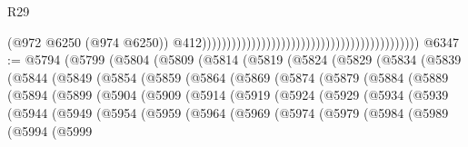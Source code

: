 \begin{lexlean}{R29}
\begin{coremodule}
                                                                                            (@972
                                                                                              @6250
                                                                                              (@974
                                                                                                @6250))
                                                                                            @412))))))))))))))))))))))))))))))))))))))))))))
@6347 := @5794
    (@5799
      (@5804
        (@5809
          (@5814
            (@5819
              (@5824
                (@5829
                  (@5834
                    (@5839
                      (@5844
                        (@5849
                          (@5854
                            (@5859
                              (@5864
                                (@5869
                                  (@5874
                                    (@5879
                                      (@5884
                                        (@5889
                                          (@5894
                                            (@5899
                                              (@5904
                                                (@5909
                                                  (@5914
                                                    (@5919
                                                      (@5924
                                                        (@5929
                                                          (@5934
                                                            (@5939
                                                              (@5944
                                                                (@5949
                                                                  (@5954
                                                                    (@5959
                                                                      (@5964
                                                                        (@5969
                                                                          (@5974
                                                                            (@5979
                                                                              (@5984
                                                                                (@5989
                                                                                  (@5994
                                                                                    (@5999

\end{coremodule}
\end{lexlean}
